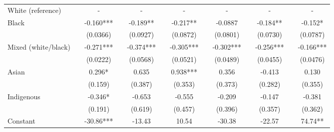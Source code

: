 \documentclass[a4paper, 12pt]{article}
\begin{document}
\begin{table}[htbp]
\begin{adjustbox}{max width=\textwidth}
\begin{tabular}{lllllllllllll}
    White (reference) &       & \multicolumn{1}{c}{-} &       & \multicolumn{1}{c}{-} &       & \multicolumn{1}{c}{-} &       & \multicolumn{1}{c}{-} &       & \multicolumn{1}{c}{-} &       & \multicolumn{1}{c}{-} \\
    Black &       & \multicolumn{1}{c}{-0.160***} &       & \multicolumn{1}{c}{-0.189**} &       & \multicolumn{1}{c}{-0.217**} &       & \multicolumn{1}{c}{-0.0887} &       & \multicolumn{1}{c}{-0.184**} &       & \multicolumn{1}{c}{-0.152*} \\
          &       & \multicolumn{1}{c}{(0.0366)} &       & \multicolumn{1}{c}{(0.0927)} &       & \multicolumn{1}{c}{(0.0872)} &       & \multicolumn{1}{c}{(0.0801)} &       & \multicolumn{1}{c}{(0.0730)} &       & \multicolumn{1}{c}{(0.0787)} \\
    Mixed (white/black) &       & \multicolumn{1}{c}{-0.271***} &       & \multicolumn{1}{c}{-0.374***} &       & \multicolumn{1}{c}{-0.305***} &       & \multicolumn{1}{c}{-0.302***} &       & \multicolumn{1}{c}{-0.256***} &       & \multicolumn{1}{c}{-0.166***} \\
          &       & \multicolumn{1}{c}{(0.0222)} &       & \multicolumn{1}{c}{(0.0568)} &       & \multicolumn{1}{c}{(0.0521)} &       & \multicolumn{1}{c}{(0.0489)} &       & \multicolumn{1}{c}{(0.0455)} &       & \multicolumn{1}{c}{(0.0476)} \\
    Asian &       & \multicolumn{1}{c}{0.296*} &       & \multicolumn{1}{c}{0.635} &       & \multicolumn{1}{c}{0.938***} &       & \multicolumn{1}{c}{0.356} &       & \multicolumn{1}{c}{-0.413} &       & \multicolumn{1}{c}{0.130} \\
          &       & \multicolumn{1}{c}{(0.159)} &       & \multicolumn{1}{c}{(0.387)} &       & \multicolumn{1}{c}{(0.353)} &       & \multicolumn{1}{c}{(0.373)} &       & \multicolumn{1}{c}{(0.282)} &       & \multicolumn{1}{c}{(0.355)} \\
    Indigenous &       & \multicolumn{1}{c}{-0.346*} &       & \multicolumn{1}{c}{-0.653} &       & \multicolumn{1}{c}{-0.555} &       & \multicolumn{1}{c}{-0.209} &       & \multicolumn{1}{c}{-0.147} &       & \multicolumn{1}{c}{-0.381} \\
          &       & \multicolumn{1}{c}{(0.191)} &       & \multicolumn{1}{c}{(0.619)} &       & \multicolumn{1}{c}{(0.457)} &       & \multicolumn{1}{c}{(0.396)} &       & \multicolumn{1}{c}{(0.357)} &       & \multicolumn{1}{c}{(0.362)} \\
    Constant &       & \multicolumn{1}{c}{-30.86***} &       & \multicolumn{1}{c}{-13.43} &       & \multicolumn{1}{c}{10.54} &       & \multicolumn{1}{c}{-30.38} &       & \multicolumn{1}{c}{-22.57} &       & \multicolumn{1}{c}{74.74**} \\

\end{tabular}
\end{adjustbox}
\end{table}
\end{document}
